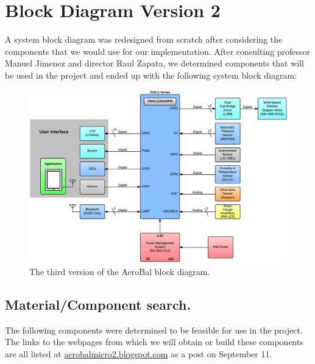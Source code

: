 \section{Block Diagram Version 2}
		A system block diagram was redesigned from scratch after considering the components that we would use for our implementation. After consulting professor Manuel Jimenez and director Raul Zapata, we determined components that will be used in the project and ended up with the following system block diagram:

		
		\begin{figure}[H]
			\centering
				\includegraphics[scale=0.18]{img/sbdv3}
			\caption{The third version of the AeroBal block diagram.}
		\end{figure}

		\subsection{Material/Component search.}

			The following components were determined to be feasible for use in the project. The links to the webpages from which we will obtain or build these components are all listed at \url{aerobalmicro2.blogspot.com} as a post on September 11.

